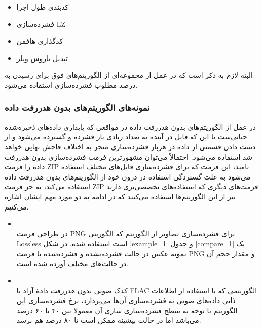 \begin{itemize}
	\item کدبندی طول اجرا
	\item فشرده‌سازی LZ
	\item کدگذاری هافمن
	\item تبدیل باروس-ویلر
\end{itemize}

البته لازم به ذکر است که در عمل از مجموعه‌ای از الگوریتم‌های فوق برای رسیدن به درصد مطلوب فشرده‌سازی استفاده می‌شود.

\subsubsection{نمونه‌های الگوریتم‌های بدون هدررفت داده}
در عمل از الگوریتم‌های بدون هدررفت داده در مواقعی که 
پایداری داده‌های ذخیره‌شده حیاتی‌ست یا این که فایل در آینده به تعداد زیادی بار فشرده و گسترده می‌شود و از دست دادن قسمتی از داده در
هربار فشرده‌سازی منجر به اختلاف فاحش نهایی خواهد شد استفاده می‌شود. احتمالاً می‌توان مشهورترین فرمت فشرده‌سازی بدون هدررفت داده را
فرمت 
ZIP
نامید، این فرمت که برای فشرده‌سازی فایل‌های مختلف استفاده می‌شود به علت گستردگی استفاده در درون خود از 
الگوریتم‌های بدون هدررفت داده استفاده می‌کند، به جز فرمت ZIP 
فرمت‌های دیگری که استفاده‌های تخصصی‌تری دارند نیز از این الگوریتم‌ها استفاده می‌کنند که در ادامه به دو مورد مهم ایشان اشاره می‌کنیم.

\begin{itemize}
	\item {}\\
	در طراحی فرمت PNG برای فشرده‌سازی تصاویر از الگوریتم
	که الگوریتی Lossless است استفاده شده. 
	در 
	شکل 	\ref{example_1} و 
	جدول 	\ref{compare_1} 
	یک نمونه عکس در حالت فشرده‌نشده و فشرده‌شده با فرمت PNG
	و مقدار حجم آن در حالت‌های مختلف آورده شده است.

	\item {}\\
	کدک صوتی بدون هدررفت دادهٔ آزاد  یا FLAC
	الگوریتمی که با استفاده از اطلاعات ذاتی داده‌های صوتی به فشرده‌سازی آن‌ها می‌پردازد، نرخ فشرده‌سازی این الگوریتم با توجه به 
	سطح فشرده‌سازی سازی آن معمولا بین ۴۰ تا ۶۰ درصد می‌باشد اما در حالت بیشینه ممکن است تا ۸۰ درصد هم برسد.
	
\end{itemize}


